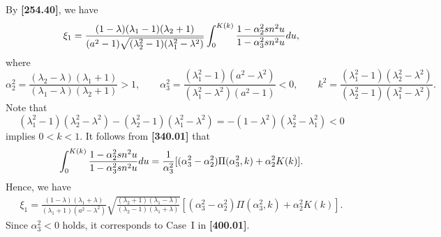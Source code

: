 \documentclass[11pt]{amsart}
\numberwithin{equation}{section}
\numberwithin{figure}{section}
\theoremstyle{plain} %
\theoremstyle{definition} %
\begin{document}
By  \textbf{[254.40]}, we have
\[
\xi_1 = \frac{(1-\lambda)(\lambda_1-1)(\lambda_2+1)}{(a^2-1)\sqrt{(\lambda_2^2-1)(\lambda_1^2-\lambda^2)}}
\int_0^{K(k)} \frac{1-\alpha_2^2 {\rm sn}^2 u}{1-\alpha_3^2 {\rm sn}^2 u} du, 
\]
where 
\[
\alpha_2^2 = \frac{(\lambda_2-\lambda)(\lambda_1+1)}{(\lambda_1-\lambda)(\lambda_2+1)}>1, \qquad
\alpha_3^2 = \frac{(\lambda_1^2-1)(a^2-\lambda^2)}{(\lambda_1^2-\lambda^2)(a^2-1)}<0, \qquad 
k^2 = \frac{(\lambda_1^2-1)(\lambda_2^2-\lambda^2)}{(\lambda_2^2-1)(\lambda_1^2-\lambda^2)}. 
\]
Note that 
\[
(\lambda_1^2-1)(\lambda_2^2-\lambda^2)-(\lambda_2^2-1)(\lambda_1^2-\lambda^2)
= -(1-\lambda^2)(\lambda_2^2-\lambda_1^2)<0
\]
implies $0<k<1$. It follows from \textbf{[340.01]} that  
\[
\int_0^{K(k)} \frac{1-\alpha_2^2 {\rm sn}^2 u}{1-\alpha_3^2 {\rm sn}^2 u} du 
= \frac{1}{\alpha_3^2} [ (\alpha_3^2-\alpha_2^2) \Pi (\alpha_3^2,k)+\alpha_2^2 K (k)]. 
\]
Hence, we have 
\begin{align*}
\xi_1 = \frac{(1-\lambda)(\lambda_1+\lambda)}{(\lambda_1+1)(a^2-\lambda^2)}
\sqrt{\frac{(\lambda_2+1)(\lambda_1-\lambda)}{(\lambda_2-1)(\lambda_1+\lambda)}}
[ (\alpha_3^2-\alpha_2^2) \Pi (\alpha_3^2,k)+\alpha_2^2 K (k)]. 
\end{align*}
Since $\alpha_3^2<0$ holds, it corresponds to Case~I in \textbf{[400.01]}. 
\end{document}
